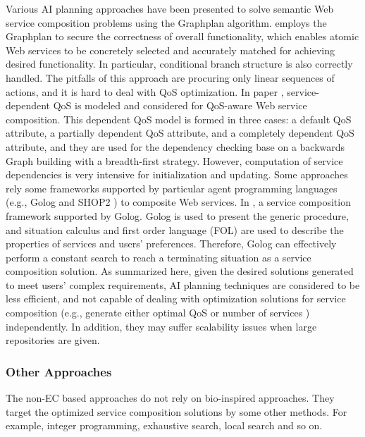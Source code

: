 Various AI planning approaches \cite{feng2013dynamic,huang2009effective,rao2006mixed,wang2013genetic, wang2014automated} have been presented to solve semantic Web service composition problems using the Graphplan \cite{blum1997fast} algorithm. \cite{wang2014automated} employs the Graphplan to secure the correctness of overall functionality, which enables atomic Web services to be concretely selected and accurately matched for achieving desired functionality. In particular, conditional branch structure is also correctly handled. The pitfalls of this approach are procuring only linear sequences of actions, and it is hard to deal with QoS optimization. In paper \cite{feng2013dynamic}, service-dependent QoS is modeled and considered for QoS-aware Web service composition. This dependent QoS model is formed in three cases: a default QoS attribute, a partially dependent QoS attribute, and a completely dependent QoS attribute, and they are used for the dependency checking base on a backwards Graph building with a breadth-first strategy. However, computation of service dependencies is very intensive for initialization and updating. Some approaches \cite{lecue2007making,sohrabi2009Web} rely some frameworks supported by particular agent programming languages (e.g., Golog \cite{sohrabi2009Web}  and SHOP2 \cite{sirin2004htn}) to composite Web services. In \cite{sohrabi2009Web}, a service composition framework supported by Golog. Golog is used to present the generic procedure, and situation calculus and first order language (FOL) are used to describe the properties of services and users' preferences. Therefore, Golog can effectively perform a constant search to reach a terminating situation as a service composition solution. As summarized here, given the desired solutions generated to meet users' complex requirements, AI planning techniques are considered to be less efficient, and not capable of dealing with optimization solutions for service composition (e.g., generate either optimal QoS or number of services ) independently. In addition, they may suffer scalability issues when large repositories are given. 

\subsubsection{Other Approaches}
The non-EC based approaches do not rely on bio-inspired approaches. They target the optimized service composition solutions by some other methods. For example, integer programming, exhaustive search, local search and so on.

